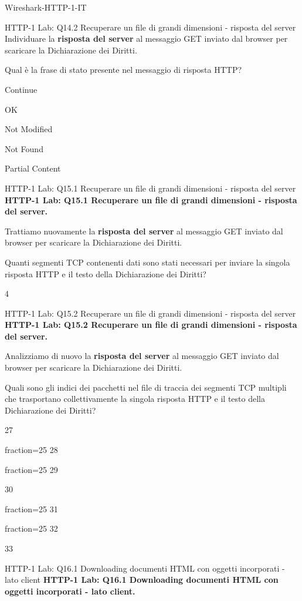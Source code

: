 \documentclass[a4paper]{article}
\begin{document}
\begin{quiz}{Wireshark-HTTP-1-IT}
\begin{multi}[points=1,shuffle]{HTTP-1 Lab: Q14.2 Recuperare un file di grandi dimensioni - risposta del server}
Individuare la \textbf{risposta del server} al messaggio GET inviato dal browser per scaricare la Dichiarazione dei Diritti.

Qual è la frase di stato presente nel messaggio di risposta HTTP? 
\item Continue
\item* OK
\item Not Modified
\item Not Found
\item Partial Content
\end{multi}

\begin{shortanswer}[points=1]{HTTP-1 Lab: Q15.1 Recuperare un file di grandi dimensioni - risposta del server}
\textbf{HTTP-1 Lab: Q15.1 Recuperare un file di grandi dimensioni - risposta del server.} 

Trattiamo nuovamente la \textbf{risposta del server} al messaggio GET inviato dal browser per scaricare la Dichiarazione dei Diritti. 

Quanti segmenti TCP contenenti dati sono stati necessari per inviare la singola risposta HTTP e il testo della Dichiarazione dei Diritti?
\item 4
\end{shortanswer}

\begin{multi}[points=1,multiple]{HTTP-1 Lab: Q15.2 Recuperare un file di grandi dimensioni - risposta del server}
\textbf{HTTP-1 Lab: Q15.2 Recuperare un file di grandi dimensioni - risposta del server.} 

Analizziamo di nuovo la \textbf{risposta del server} al messaggio GET inviato dal browser per scaricare la Dichiarazione dei Diritti. 

Quali sono gli indici dei pacchetti nel file di traccia dei segmenti TCP multipli che trasportano collettivamente la singola risposta HTTP e il testo della Dichiarazione dei Diritti? 
\item 27
\item[fraction=25] 28
\item[fraction=25] 29
\item 30
\item[fraction=25] 31
\item[fraction=25] 32
\item 33
\end{multi}

\begin{shortanswer}[points=1]{HTTP-1 Lab: Q16.1 Downloading documenti HTML con oggetti incorporati - lato client}
\textbf{HTTP-1 Lab: Q16.1 Downloading documenti HTML con oggetti incorporati - lato client.}


\end{shortanswer}
\end{quiz}
\end{document}
